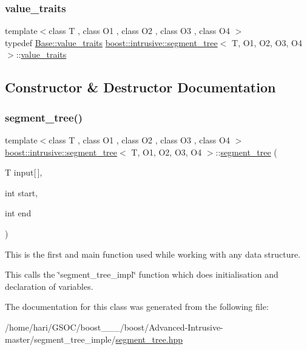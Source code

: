\subsubsection{\texorpdfstring{value\+\_\+traits}{value\_traits}}
{\footnotesize\ttfamily template$<$class T , class O1 , class O2 , class O3 , class O4 $>$ \\
typedef \hyperlink{classboost_1_1intrusive_1_1segment__tree__impl_a929c1b3f1e6bb851a911b9b54a4c0dc2}{Base\+::value\+\_\+traits} \hyperlink{classboost_1_1intrusive_1_1segment__tree}{boost\+::intrusive\+::segment\+\_\+tree}$<$ T, O1, O2, O3, O4 $>$\+::\hyperlink{classboost_1_1intrusive_1_1segment__tree__impl_a929c1b3f1e6bb851a911b9b54a4c0dc2}{value\+\_\+traits}}



\subsection{Constructor \& Destructor Documentation}
\mbox{\label{classboost_1_1intrusive_1_1segment__tree_a30f63674d219804557316b5c58154d5c}} 
\subsubsection{\texorpdfstring{segment\+\_\+tree()}{segment\_tree()}}
{\footnotesize\ttfamily template$<$class T , class O1 , class O2 , class O3 , class O4 $>$ \\
\hyperlink{classboost_1_1intrusive_1_1segment__tree}{boost\+::intrusive\+::segment\+\_\+tree}$<$ T, O1, O2, O3, O4 $>$\+::\hyperlink{classboost_1_1intrusive_1_1segment__tree}{segment\+\_\+tree} (\begin{DoxyParamCaption}\item[{T}]{input\mbox{[}$\,$\mbox{]},  }\item[{int}]{start,  }\item[{int}]{end }\end{DoxyParamCaption})\hspace{0.3cm}{\ttfamily [inline]}}


\begin{DoxyItemize}
\item This is the first and main function used while working with any data structure. 
\item This calls the \char`\"{}segment\+\_\+tree\+\_\+impl\char`\"{} function which does initialisation and declaration of variables. 
\end{DoxyItemize}

The documentation for this class was generated from the following file\+:\begin{DoxyCompactItemize}
\item 
/home/hari/\+G\+S\+O\+C/boost\+\_\+\_\+\_/boost/\+Advanced-\/\+Intrusive-\/master/segment\+\_\+tree\+\_\+imple/\hyperlink{segment__tree_8hpp}{segment\+\_\+tree.\+hpp}\end{DoxyCompactItemize}
